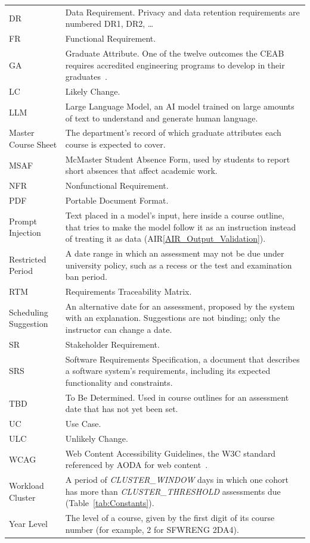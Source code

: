 \documentclass[12pt]{article}
\newcommand{\airref}[1]{AIR\ref{#1}}
\begin{document}
{\begin{longtable}{>{\raggedright\arraybackslash}p{} >{\raggedright\arraybackslash}p{}}
DR & Data Requirement. Privacy and data retention requirements are numbered DR1, DR2, \ldots{}\\
FR & Functional Requirement.\\
GA & Graduate Attribute. One of the twelve outcomes the CEAB requires accredited engineering programs to develop in their graduates~\citep{CEAB2025}.\\
LC & Likely Change.\\
LLM & Large Language Model, an AI model trained on large amounts of text to understand and generate human language.\\
Master Course Sheet & The department's record of which graduate attributes each course is expected to cover.\\
MSAF & McMaster Student Absence Form, used by students to report short absences that affect academic work.\\
NFR & Nonfunctional Requirement.\\
PDF & Portable Document Format.\\
Prompt Injection & Text placed in a model's input, here inside a course outline, that tries to make the model follow it as an instruction instead of treating it as data (\airref{AIR_Output_Validation}).\\
Restricted Period & A date range in which an assessment may not be due under university policy, such as a recess or the test and examination ban period.\\
RTM & Requirements Traceability Matrix.\\
Scheduling Suggestion & An alternative date for an assessment, proposed by the system with an explanation. Suggestions are not binding; only the instructor can change a date.\\
SR & Stakeholder Requirement.\\
SRS & Software Requirements Specification, a document that describes a software system's requirements, including its expected functionality and constraints.\\
TBD & To Be Determined. Used in course outlines for an assessment date that has not yet been set.\\
UC & Use Case.\\
ULC & Unlikely Change.\\
WCAG & Web Content Accessibility Guidelines, the W3C standard referenced by AODA for web content~\citep{WCAG20, IASR2011}.\\
Workload Cluster & A period of \textit{CLUSTER\_\allowbreak{}WINDOW} days in which one cohort has more than \textit{CLUSTER\_\allowbreak{}THRESHOLD} assessments due (Table~\ref{tab:Constants}).\\
Year Level & The level of a course, given by the first digit of its course number (for example, 2 for SFWRENG 2DA4).\\
\end{longtable}
}
\end{document}
